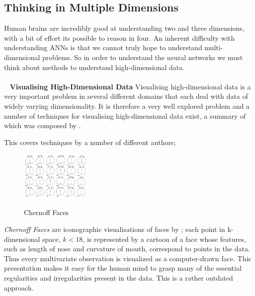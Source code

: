 \documentclass[a4paper,11pt,titlepage]{article}
\begin{document}
\subsection{Thinking in Multiple Dimensions}
	Human brains are incredibly good at understanding two and three dimensions, with a bit of effort its possible to reason in four. An inherent difficulty with understanding ANNs is that we cannot truly hope to understand multi-dimensional problems. So in order to understand the neural networks we must think about methods to understand high-dimensional data.
\\\
\\\
\textbf{Visualising High-Dimensional Data}
	Visualising high-dimensional data is a very important problem in several different domains that each deal with data of widely varying dimensionality. It is therefore a very well explored problem and a number of techniques for visualising high-dimensional data exist, a summary of which was composed by \cite{Cristina2003}.
	\par 
	This covers techniques by a number of different authors;	
		\par
		
 	\begin{figure}[H]
    			\centering	
			{{\includegraphics[width=0.3\textwidth]
    				{img/chernoff_faces} 
    			}}%
    			\caption{Chernoff Faces}%
    		\label{fig:lascaux}
	\end{figure}
 		
		 \textit{Chernoff Faces} are iconographic visualisations of faces by \cite{Chernoff1973}; each point in k-dimensional space, $ k < 18 $, is represented by a cartoon of a face whose features, such as length of nose and curvature of mouth, correspond to points in the data. Thus every multivariate observation is visualized as a computer-drawn face. This presentation makes it easy for the human mind to grasp many of the essential regularities and irregularities present in the data. This is a rather outdated approach.
		 \par
 		
\end{document}
